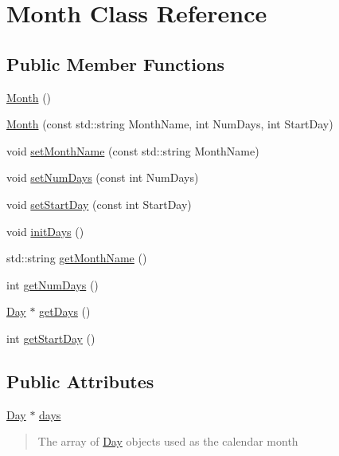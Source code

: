 \hypertarget{class_month}{}\section{Month Class Reference}
\label{class_month}
\subsection*{Public Member Functions}
\begin{DoxyCompactItemize}
\item 
\hyperlink{class_month_a36882c55ece9c4210ec1b01bd665ec89}{Month} ()
\item 
\hyperlink{class_month_ae2b064f3abf4c38a9e2527920831ed3f}{Month} (const std\+::string Month\+Name, int Num\+Days, int Start\+Day)
\item 
void \hyperlink{class_month_a77dee92af5de872d8579b1b142473f90}{set\+Month\+Name} (const std\+::string Month\+Name)
\item 
void \hyperlink{class_month_a661a751213b495884ec258d3e6c687e9}{set\+Num\+Days} (const int Num\+Days)
\item 
void \hyperlink{class_month_ae9730715451148a5a4629b9c450e8103}{set\+Start\+Day} (const int Start\+Day)
\item 
void \hyperlink{class_month_a9309f01ffc97e5bbb13bf8f5801f2aec}{init\+Days} ()
\item 
std\+::string \hyperlink{class_month_a1cb2ba2c0e646b961f55d99e9f5b74de}{get\+Month\+Name} ()
\item 
int \hyperlink{class_month_a5ab8e306d9f603872dcf68b7bc771aa0}{get\+Num\+Days} ()
\item 
\hyperlink{class_day}{Day} $\ast$ \hyperlink{class_month_ab562a3d12216892324cfcfb2ba9503a6}{get\+Days} ()
\item 
int \hyperlink{class_month_a5fd5d2bf55df35f09262198e416e1906}{get\+Start\+Day} ()
\end{DoxyCompactItemize}
\subsection*{Public Attributes}
\begin{DoxyCompactItemize}
\item 
\hyperlink{class_day}{Day} $\ast$ \hyperlink{class_month_a8ade9e4309247818f04ce3e7f7682d6f}{days}\hypertarget{class_month_a8ade9e4309247818f04ce3e7f7682d6f}{}\label{class_month_a8ade9e4309247818f04ce3e7f7682d6f}

\begin{DoxyCompactList}\small\item\em \begin{quote}
The array of \hyperlink{class_day}{Day} objects used as the calendar month \end{quote}
\end{DoxyCompactList}\end{DoxyCompactItemize}


